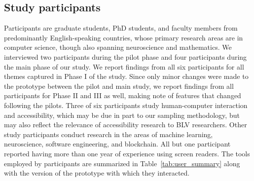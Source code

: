 \subsection{Study participants}

Participants are graduate students, PhD students, and faculty members from predominantly English-speaking countries, whose primary research areas are in computer science, though also spanning neuroscience and mathematics. We interviewed two participants during the pilot phase and four participants during the main phase of our study. We report findings from all six participants for all themes captured in Phase I of the study. Since only minor changes were made to the prototype between the pilot and main study, we report findings from all participants for Phase II and III as well, making note of features that changed following the pilots. Three of six participants
study human-computer interaction and accessibility, which may be due in part to our sampling methodology, but may also reflect the relevance of accessibility research to BLV researchers. Other study participants conduct research in the areas of machine learning, neuroscience, software engineering, and blockchain. All but one participant reported having more than one year of experience using screen readers. The tools employed by participants are summarized in Table~\ref{tab:user_summary} along with the version of the \scially prototype with which they interacted.

